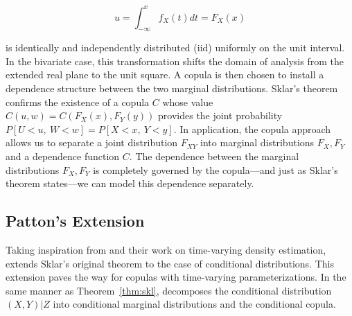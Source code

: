 \begin{equation} \label{eqn:PIT}
	u=\int_{-\infty}^{x}f_{X}\left(t\right) dt=F_{X}\left(x\right)
\end{equation}

is identically and independently distributed (iid) uniformly on the unit interval. In the bivariate case, this transformation shifts the domain of analysis from the extended real plane to the unit square. A copula is then chosen to install a dependence structure between the two marginal distributions. Sklar's theorem confirms the existence of a copula $C$ whose value $C\left(u,w\right) = C\left(F_{X}\left(x\right), F_{Y}\left(y\right)\right)$ provides the joint probability $P\left[U < u,~W < w\right] = P\left[X < x,~Y < y\right]$. In application, the copula approach allows us to separate a joint distribution $F_{XY}$ into marginal distributions $F_{X},F_{Y}$ and a dependence function $C$. The dependence between the marginal distributions $F_{X},F_{Y}$ is completely governed by the copula---and just as Sklar's theorem states---we can model this dependence separately.

\subsection{Patton's Extension}

Taking inspiration from \cite{Hansen_1994} and their work on time-varying density estimation, \cite{Patton_2006} extends Sklar's original theorem to the case of conditional distributions. This extension paves the way for copulas with time-varying parameterizations. In the same manner as Theorem~\ref{thm:skl}, \cite{Patton_2006} decomposes the conditional distribution $\left(X,Y\right) | Z$ into conditional marginal distributions and the conditional copula.


